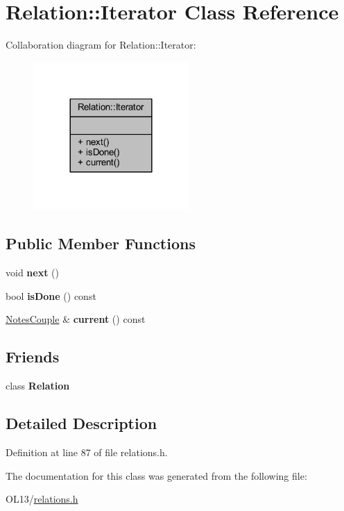 \hypertarget{class_relation_1_1_iterator}{}\section{Relation\+:\+:Iterator Class Reference}
\label{class_relation_1_1_iterator}


Collaboration diagram for Relation\+:\+:Iterator\+:\nopagebreak
\begin{figure}[H]
\begin{center}
\leavevmode
\includegraphics[width=168pt]{class_relation_1_1_iterator__coll__graph}
\end{center}
\end{figure}
\subsection*{Public Member Functions}
\begin{DoxyCompactItemize}
\item 
\mbox{\label{class_relation_1_1_iterator_a8ff276d2d33755160725b5dbc4a95a72}} 
void {\bfseries next} ()
\item 
\mbox{\label{class_relation_1_1_iterator_ac99e741753998f6c314c3b7884d4dd44}} 
bool {\bfseries is\+Done} () const
\item 
\mbox{\label{class_relation_1_1_iterator_a4d68e76ae0fbe22f025ee747218beb26}} 
\hyperlink{class_notes_couple}{Notes\+Couple} \& {\bfseries current} () const
\end{DoxyCompactItemize}
\subsection*{Friends}
\begin{DoxyCompactItemize}
\item 
\mbox{\label{class_relation_1_1_iterator_a7ee004262f27f8c916688911a71e3aa1}} 
class {\bfseries Relation}
\end{DoxyCompactItemize}


\subsection{Detailed Description}


Definition at line 87 of file relations.\+h.



The documentation for this class was generated from the following file\+:\begin{DoxyCompactItemize}
\item 
O\+L13/\hyperlink{relations_8h}{relations.\+h}\end{DoxyCompactItemize}
